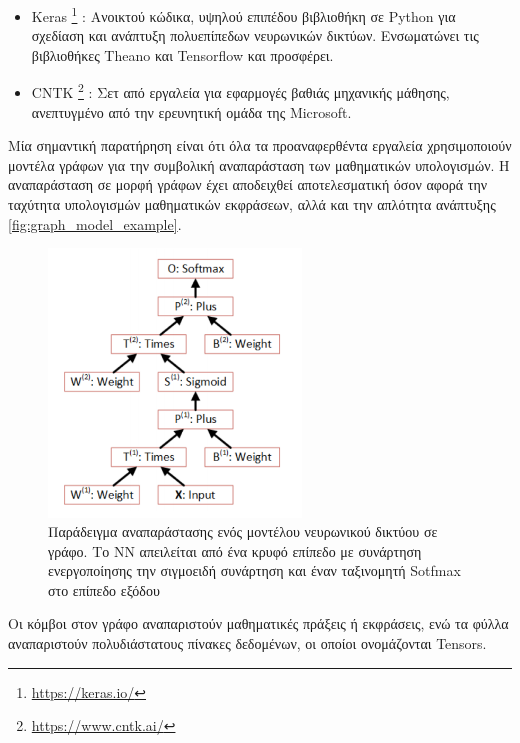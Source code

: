 \begin{itemize}
{      Framework για γρήγορη ανάπτυξη και δοκιμή αλγορίθμων μηχανικής μάθησης.}
    \item{Keras \footnote{\href{https://keras.io/}{https://keras.io/}} \cite{chollet2015keras}:
    Ανοικτού κώδικα, υψηλού επιπέδου βιβλιοθήκη σε Python για σχεδίαση και ανάπτυξη
    πολυεπίπεδων νευρωνικών δικτύων. Ενσωματώνει
    τις βιβλιοθήκες Theano και Tensorflow και προσφέρει.}
  \item{CNTK \footnote{\href{https://www.cntk.ai/}{https://www.cntk.ai/}} \cite{Seide:2016:CMO:2939672.2945397}:
    Σετ από εργαλεία για εφαρμογές βαθιάς μηχανικής μάθησης, ανεπτυγμένο από την ερευνητική ομάδα της Microsoft.}
\end{itemize}

Μία σημαντική παρατήρηση είναι ότι όλα τα προαναφερθέντα εργαλεία χρησιμοποιούν μοντέλα γράφων
για την συμβολική αναπαράσταση των μαθηματικών υπολογισμών. Η αναπαράσταση σε μορφή γράφων
έχει αποδειχθεί αποτελεσματική όσον αφορά την ταχύτητα υπολογισμών μαθηματικών εκφράσεων, αλλά και την
απλότητα ανάπτυξης \autoref{fig:graph_model_example}.

\begin{figure}[!ht]
  \centering
  \includegraphics[width=0.6\textwidth]{./images/chapter4/graph_model_example.png}
  \caption[Παράδειγμα αναπαράστασης ενός μοντέλου νευρωνικού δικτύου σε γράφο.
    Το ΝΝ αποτλείται από ένα κρυφό επίπεδο
    και ένα ταξινομητή Sotfmax στο επίπεδο εξόδου]{
    Παράδειγμα αναπαράστασης ενός μοντέλου νευρωνικού δικτύου σε γράφο.
    Το ΝΝ απειλείται από ένα κρυφό επίπεδο με συνάρτηση ενεργοποίησης την σιγμοειδή συνάρτηση
    και έναν ταξινομητή Sotfmax στο επίπεδο εξόδου}
  \label{fig:graph_model_example}
\end{figure}
Οι κόμβοι στον γράφο αναπαριστούν μαθηματικές πράξεις ή εκφράσεις, ενώ τα φύλλα
αναπαριστούν πολυδιάστατους πίνακες δεδομένων, οι οποίοι ονομάζονται Tensors.

